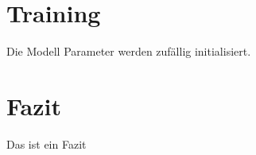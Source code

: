 \documentclass[conference]{IEEEtran}
\begin{document}
\section{Training}
Die Modell Parameter werden zufällig initialisiert.

\section{Fazit}
Das ist ein Fazit



\printbibliography
\end{document}
